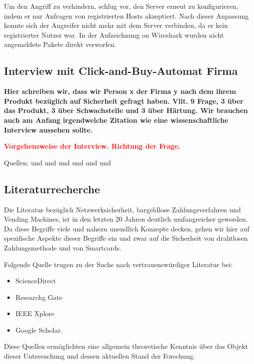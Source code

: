 Um den Angriff zu verhindern, schlug \cite{refip:NYRS} vor, den Server erneut zu konfigurieren, indem er 
nur Anfragen von registrierten Hosts akzeptiert. Nach dieser Anpassung konnte sich der Angreifer nicht 
mehr mit dem Server verbinden, da er kein registrierter Nutzer war. In der Aufzeichnung on Wireshark wurden
nicht angemeldete Pakete direkt verworfen.

\subsection{Interview mit Click-and-Buy-Automat Firma}

\textbf{Hier schreiben wir, dass wir Person x der Firma y nach dem ihrem Produkt bezüglich auf Sicherheit gefragt haben.
Vllt. 9 Frage, 3 über das Produkt, 3 über Schwachstelle und 3 über Härtung. Wir brauchen auch am Anfang irgendwelche Zitation
wie eine wissenschaftliche Interview aussehen sollte.}

\textbf{\textcolor{red}{Vorgehensweise der Interview. Richtung der Frage.}}

Quellen: \cite{refbook:RECR} und \cite{refbook:CESR} und  \cite{refbook:DMFG} und \cite{refbook:APGF}
und \cite{refbook:EFAF} und \cite{flick2011triangulation} und \cite{alber2017biografieforschung}

\subsection{Literaturrecherche}

Die Literatur bezüglich Netzwerksicherheit, bargeldlose Zahlungsverfahren und Vending Machines, ist in den 
letzten 20 Jahren deutlich umfangreicher geworden. Da diese Begriffe viele und nahezu unendlich Konzepte 
decken, gehen wir hier auf spezifische Aspekte dieser Begriffe ein und zwar auf die Sicherheit von drahtlosen 
Zahlungsmethode und von Smartcards. 

Folgende Quelle trugen zu der Suche nach vertrauenswürdiger Literatur bei:

\begin{itemize}
    \item ScienceDirect
    \item Researchg Gate
    \item IEEE Xplore
    \item Google Scholar.
\end{itemize}

Diese Quellen ermöglichten eine allgemein theoretische Kenntnis über das Objekt dieser Untersuchung und dessen aktuellen 
Stand der Forschung.